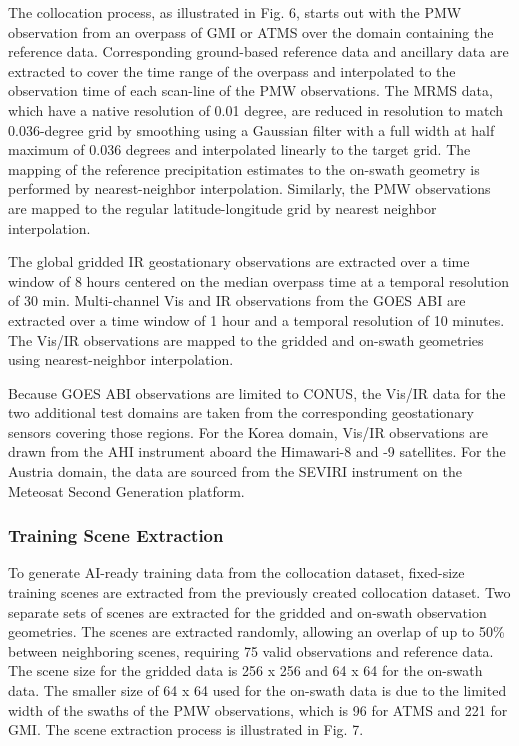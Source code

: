 \documentclass[11pt]{article}
\begin{document}
The collocation process, as illustrated in Fig. 6, starts out with the PMW
observation from an overpass of GMI or ATMS over the domain containing the
reference data. Corresponding ground-based reference data and ancillary data are
extracted to cover the time range of the overpass and interpolated to the
observation time of each scan-line of the PMW observations. The MRMS data, which
have a native resolution of 0.01 degree, are reduced in resolution to match
0.036-degree grid by smoothing using a Gaussian filter with a full width at half
maximum of 0.036 degrees and interpolated linearly to the target grid. The
mapping of the reference precipitation estimates to the on-swath geometry is
performed by nearest-neighbor interpolation. Similarly, the PMW observations are
mapped to the regular latitude-longitude grid by nearest neighbor interpolation.

The global gridded IR geostationary observations are extracted over a time
window of 8 hours centered on the median overpass time at a temporal resolution
of 30 min. Multi-channel Vis and IR observations from the GOES ABI are extracted
over a time window of 1 hour and a temporal resolution of 10 minutes. The Vis/IR
observations are mapped to the gridded and on-swath geometries using
nearest-neighbor interpolation.

Because GOES ABI observations are limited to CONUS, the Vis/IR data for the two
additional test domains are taken from the corresponding geostationary sensors
covering those regions. For the Korea domain, Vis/IR observations are drawn from
the AHI instrument aboard the Himawari-8 and -9 satellites. For the Austria
domain, the data are sourced from the SEVIRI instrument on the Meteosat Second
Generation platform.

\subsubsection{Training Scene Extraction}


To generate AI-ready training data from the collocation dataset, fixed-size
training scenes are extracted from the previously created collocation dataset.
Two separate sets of scenes are extracted for the gridded and on-swath
observation geometries. The scenes are extracted randomly, allowing an overlap
of up to 50\% between neighboring scenes, requiring 75%
valid observations and reference data. The scene size for the gridded data is
256 x 256 and 64 x 64 for the on-swath data. The smaller size of 64 x 64 used
for the on-swath data is due to the limited width of the swaths of the PMW
observations, which is 96 for ATMS and 221 for GMI. The scene extraction process
is illustrated in Fig. 7.
\end{document}
